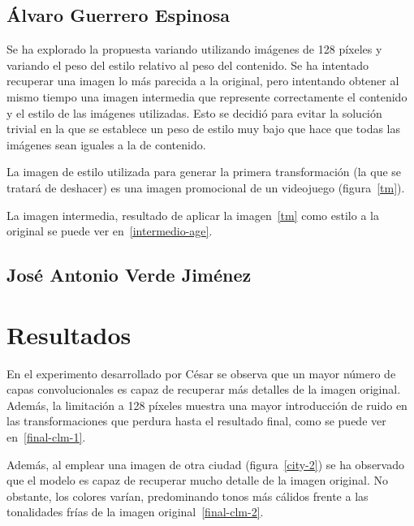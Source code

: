\documentclass[es]{uc3mreport}
\begin{document}
\begin{report}
            \subsection{Álvaro Guerrero Espinosa}
            Se ha explorado la propuesta variando utilizando imágenes de 128
            píxeles y variando el peso del estilo relativo al peso del
            contenido. Se ha intentado recuperar una imagen lo más parecida a la
            original, pero intentando obtener al mismo tiempo una imagen intermedia
            que represente correctamente el contenido y el estilo de las imágenes
            utilizadas. Esto se decidió para evitar la solución trivial en la que se
            establece un peso de estilo muy bajo que hace que todas las imágenes
            sean iguales a la de contenido.

            La imagen de estilo utilizada para generar la primera
            transformación (la que se tratará de deshacer) es una imagen
            promocional de un videojuego (figura~\ref{tm}).

            La imagen intermedia, resultado de aplicar la
            imagen~\ref{tm} como estilo a la original se puede ver
            en~\ref{intermedio-age}.

            \subsection{José Antonio Verde Jiménez}


        \section{Resultados}

            En el experimento desarrollado por César se observa que un mayor
            número de capas convolucionales es capaz de recuperar más detalles
            de la imagen original. Además, la limitación a 128 píxeles muestra
            una mayor introducción de ruido en las transformaciones que perdura
            hasta el resultado final, como se puede ver en~\ref{final-clm-1}.

            Además, al emplear una imagen de otra ciudad (figura~\ref{city-2})
            se ha observado que el modelo es capaz de recuperar mucho detalle
            de la imagen original. No obstante, los colores varían,
            predominando tonos más cálidos frente a las tonalidades frías de la
            imagen original~\ref{final-clm-2}.


\end{report}
\end{document}
